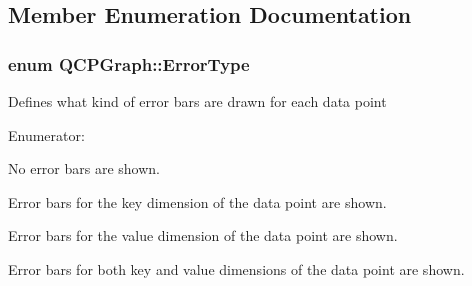 \subsection{\-Member \-Enumeration \-Documentation}
\hypertarget{classQCPGraph_ad23b514404bd2cb3216f57c90904d6af}{
\subsubsection[{\-Error\-Type}]{\setlength{\rightskip}{0pt plus 5cm}enum {\bf \-Q\-C\-P\-Graph\-::\-Error\-Type}}}\label{classQCPGraph_ad23b514404bd2cb3216f57c90904d6af}
\-Defines what kind of error bars are drawn for each data point \begin{Desc}
\item[\-Enumerator\-: ]\par
\begin{description}
\item[{\em 
\hypertarget{classQCPGraph_ad23b514404bd2cb3216f57c90904d6afaeae745e7cc1766bb8546e35d4b76a711}{et\-None}\label{classQCPGraph_ad23b514404bd2cb3216f57c90904d6afaeae745e7cc1766bb8546e35d4b76a711}
}]\-No error bars are shown. \item[{\em 
\hypertarget{classQCPGraph_ad23b514404bd2cb3216f57c90904d6afa2a5d89cd76fb8b6b18d71b8f6f6c0f43}{et\-Key}\label{classQCPGraph_ad23b514404bd2cb3216f57c90904d6afa2a5d89cd76fb8b6b18d71b8f6f6c0f43}
}]\-Error bars for the key dimension of the data point are shown. \item[{\em 
\hypertarget{classQCPGraph_ad23b514404bd2cb3216f57c90904d6afa147022ccdc49f6bd48f904cb4f61872e}{et\-Value}\label{classQCPGraph_ad23b514404bd2cb3216f57c90904d6afa147022ccdc49f6bd48f904cb4f61872e}
}]\-Error bars for the value dimension of the data point are shown. \item[{\em 
\hypertarget{classQCPGraph_ad23b514404bd2cb3216f57c90904d6afa761cb7d61670c1e2efecccd8974409ab}{et\-Both}\label{classQCPGraph_ad23b514404bd2cb3216f57c90904d6afa761cb7d61670c1e2efecccd8974409ab}
}]\-Error bars for both key and value dimensions of the data point are shown. \end{description}
\end{Desc}

